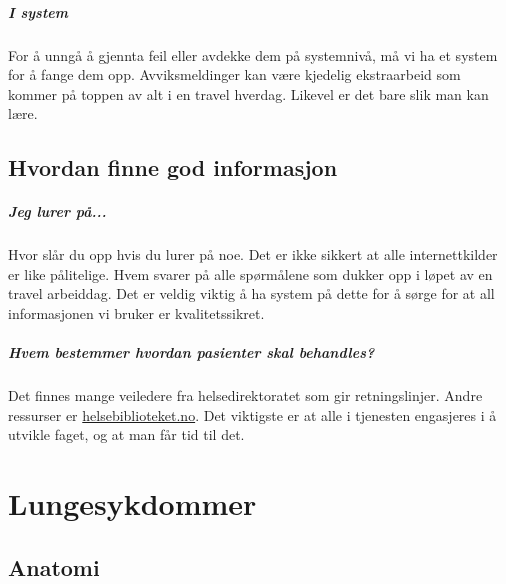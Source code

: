 \documentclass[a4paper,12pt,twoside]{memoir}
\begin{document}
			\paragraph{I system\\}
				For å unngå å gjennta feil eller avdekke dem på systemnivå, må vi ha et system for å fange dem opp. Avviksmeldinger kan være kjedelig ekstraarbeid som kommer på toppen av alt i en travel hverdag. Likevel er det bare slik man kan lære.
		\section{Hvordan finne god informasjon}
			\paragraph{Jeg lurer på...\\}
				Hvor slår du opp hvis du lurer på noe. Det er ikke sikkert at alle internettkilder er like pålitelige. Hvem svarer på alle spørmålene som dukker opp i løpet av en travel arbeiddag. Det er veldig viktig å ha system på dette for å sørge for at all informasjonen vi bruker er kvalitetssikret. 
			\paragraph{Hvem bestemmer hvordan pasienter skal behandles?\\}
				Det finnes mange veiledere fra helsedirektoratet som gir retningslinjer. Andre ressurser er \href{http://www.helsebiblioteket.no/}{helsebiblioteket.no}. Det viktigste er at alle i tjenesten engasjeres i å utvikle faget, og at man får tid til det. 
	\chapter{Lungesykdommer}
		\section{Anatomi}
\end{document}
